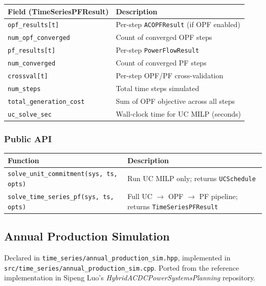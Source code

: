 \begin{center}
\begin{tabular}{ll}
\hline\hline
\textbf{Field (TimeSeriesPFResult)} & \textbf{Description} \\
\hline
\texttt{opf\_results[t]} & Per-step \texttt{ACOPFResult} (if OPF enabled) \\
\texttt{num\_opf\_converged} & Count of converged OPF steps \\
\texttt{pf\_results[t]} & Per-step \texttt{PowerFlowResult} \\
\texttt{num\_converged} & Count of converged PF steps \\
\texttt{crossval[t]} & Per-step OPF/PF cross-validation \\
\texttt{num\_steps} & Total time steps simulated \\
\texttt{total\_generation\_cost} & Sum of OPF objective across all steps \\
\texttt{uc\_solve\_sec} & Wall-clock time for UC MILP (seconds) \\
\hline\hline
\end{tabular}
\end{center}

\subsubsection{Public API}

\begin{center}
\begin{tabular}{ll}
\hline\hline
\textbf{Function} & \textbf{Description} \\
\hline
\texttt{solve\_unit\_commitment(sys, ts, opts)} & Run UC MILP only; returns \texttt{UCSchedule} \\
\texttt{solve\_time\_series\_pf(sys, ts, opts)} & Full UC $\to$ OPF $\to$ PF pipeline; returns \texttt{TimeSeriesPFResult} \\
\hline\hline
\end{tabular}
\end{center}

\subsection{Annual Production Simulation}
\label{sec:annual-production-sim}

Declared in \texttt{time\_series/annual\_production\_sim.hpp},
implemented in \texttt{src/time\_series/annual\_production\_sim.cpp}.
Ported from the reference implementation in Sipeng Luo's
\textit{HybridACDCPowerSystemsPlanning} repository.

